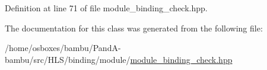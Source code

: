 Definition at line 71 of file module\+\_\+binding\+\_\+check.\+hpp.



The documentation for this class was generated from the following file\+:\begin{DoxyCompactItemize}
\item 
/home/osboxes/bambu/\+Pand\+A-\/bambu/src/\+H\+L\+S/binding/module/\hyperlink{module__binding__check_8hpp}{module\+\_\+binding\+\_\+check.\+hpp}\end{DoxyCompactItemize}
